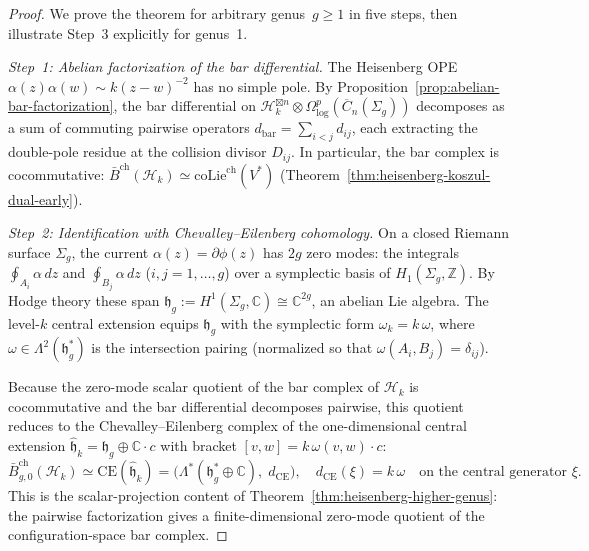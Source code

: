 \begin{proof}
We prove the theorem for arbitrary genus~$g \geq 1$ in five steps,
then illustrate Step~3 explicitly for genus~1.

\emph{Step~1: Abelian factorization of the bar differential.}
The Heisenberg OPE $\alpha(z)\alpha(w) \sim k(z-w)^{-2}$ has no
simple pole. By
Proposition~\ref{prop:abelian-bar-factorization}, the bar differential
on $\mathcal{H}_k^{\boxtimes n} \otimes
\Omega^p_{\log}(\overline{C}_n(\Sigma_g))$ decomposes as a sum of
commuting pairwise operators $d_{\mathrm{bar}} = \sum_{i<j} d_{ij}$,
each extracting the double-pole residue at the collision divisor
$D_{ij}$. In particular, the bar complex is cocommutative:
$\bar{B}^{\mathrm{ch}}(\mathcal{H}_k)
\simeq \mathrm{coLie}^{\mathrm{ch}}(V^*)$
(Theorem~\ref{thm:heisenberg-koszul-dual-early}).

\emph{Step~2: Identification with Chevalley--Eilenberg cohomology.}
On a closed Riemann surface $\Sigma_g$, the current
$\alpha(z) = \partial\phi(z)$ has $2g$ zero modes: the
integrals $\oint_{A_i} \alpha\, dz$ and $\oint_{B_j} \alpha\, dz$
($i,j = 1, \ldots, g$) over a symplectic basis of
$H_1(\Sigma_g, \mathbb{Z})$. By Hodge theory these span
$\mathfrak{h}_g := H^1(\Sigma_g, \mathbb{C}) \cong \mathbb{C}^{2g}$,
an abelian Lie algebra. The level-$k$ central extension equips
$\mathfrak{h}_g$ with the symplectic form
$\omega_k = k\,\omega$, where
$\omega \in \Lambda^2(\mathfrak{h}_g^*)$ is the intersection pairing
(normalized so that $\omega(A_i, B_j) = \delta_{ij}$).

Because the zero-mode scalar quotient of the bar complex of
$\mathcal{H}_k$ is cocommutative and the bar differential decomposes
pairwise, this quotient reduces to the Chevalley--Eilenberg complex of the one-dimensional
central extension $\hat{\mathfrak{h}}_k = \mathfrak{h}_g \oplus
\mathbb{C} \cdot c$ with bracket $[v,w] = k\,\omega(v,w)\cdot c$:
\[
\bar{B}^{\mathrm{ch}}_{g,0}(\mathcal{H}_k)
\simeq \mathrm{CE}(\hat{\mathfrak{h}}_k)
= \bigl(\Lambda^*(\mathfrak{h}_g^* \oplus \mathbb{C}),\;
 d_{\mathrm{CE}}\bigr),
\quad
d_{\mathrm{CE}}(\xi) = k\,\omega \quad
\text{on the central generator }\xi.
\]
This is the scalar-projection content of
Theorem~\ref{thm:heisenberg-higher-genus}: the pairwise
factorization gives a finite-dimensional zero-mode quotient of the
configuration-space bar complex.


\end{proof}
